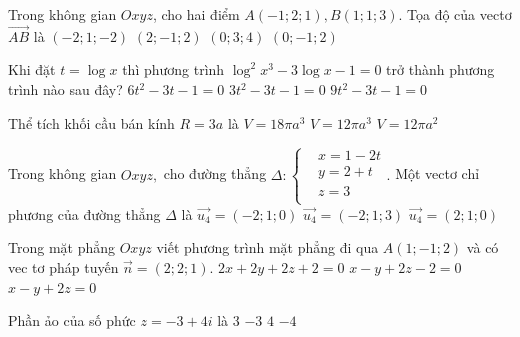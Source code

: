 \begin{ex}%
	Trong không gian $Oxyz$, cho hai điểm $A(-1;2;1),B(1;1;3)$. Tọa độ của vectơ $\overrightarrow{AB}$ là
	\choice
	{$(-2;1;-2)$}
	{\True $(2;-1;2)$}
	{ $(0;3;4)$}
	{ $(0;-1;2)$}
\end{ex}
\begin{ex}%
	Khi đặt $t=\log x$ thì phương trình ${{\log }^2}{x^3}-3\log x-1=0$ trở thành phương trình nào sau đây?
	{ $6t^2-3t-1=0$}
	{ $3t^2-3t-1=0$}
	{\True $9t^2-3t-1=0$}
\end{ex}
\begin{ex}%
	Thể tích khối cầu bán kính $R=3a$ là
	{ $V=18\pi {a^3}$}
	{ $V=12\pi {a^3}$}
	{ $V=12\pi {a^2}$}
\end{ex}
\begin{ex}%
	Trong không gian $Oxyz,$ cho đường thẳng $\Delta :\left\{ \begin{aligned}
		& x=1-2t \\
		& y=2+t \\
		& z=3 \\
	\end{aligned} \right..$ Một vectơ chỉ phương của đường thẳng $\Delta $ là
	{\True $\overrightarrow{u_4}=\left( -2;1;0 \right)$}
	{ $\overrightarrow{u_4}=\left( -2;1;3 \right)$}
	{ $\overrightarrow{u_4}=\left( 2;1;0 \right)$}
\end{ex}
\begin{ex}%
	Trong mặt phẳng $Oxyz$ viết phương trình mặt phẳng đi qua $A(1;-1;2)$ và có vec tơ pháp tuyến $\overrightarrow{n}=(2;2;1)$.
	{ $2x+2y+2z+2=0$}
	{ $x-y+2z-2=0$}
	{ $x-y+2z=0$}
\end{ex}
\begin{ex}%
	Phần ảo của số phức $z = -3 + 4i$ là
	\choice
	{ $3$}
	{ $-3$}
	{\True $4$}
	{ $-4$}
\end{ex}

